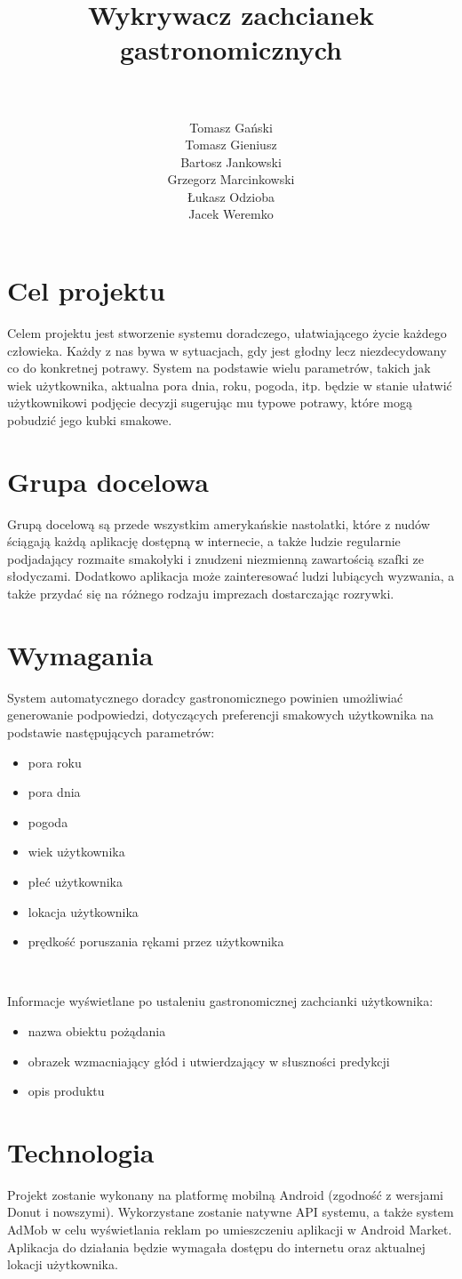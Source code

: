\documentclass[a4paper,twoside,11pt]{article}
\author{\\ ~ \\ Tomasz Gański \\
Tomasz Gieniusz \\
Bartosz Jankowski\\
Grzegorz Marcinkowski\\
Łukasz Odzioba\\
Jacek Weremko}
\title{\LARGE Wykrywacz zachcianek gastronomicznych}
\begin{document}


\tableofcontents

\newpage

\section{Cel projektu}
Celem projektu jest stworzenie systemu doradczego, ułatwiającego życie każdego człowieka. Każdy z nas bywa w sytuacjach, gdy jest głodny lecz niezdecydowany co do konkretnej potrawy. 
System na podstawie wielu parametrów, takich jak wiek użytkownika, aktualna pora dnia, roku, pogoda, itp. będzie w stanie ułatwić użytkownikowi podjęcie decyzji sugerując mu typowe potrawy, które mogą pobudzić jego kubki smakowe.

\section{Grupa docelowa}
Grupą docelową są przede wszystkim amerykańskie nastolatki, które z nudów ściągają każdą aplikację dostępną w internecie, a także ludzie regularnie podjadający rozmaite smakołyki i znudzeni niezmienną zawartością szafki ze słodyczami. Dodatkowo aplikacja może zainteresować ludzi lubiących wyzwania, a także przydać się na różnego rodzaju imprezach dostarczając rozrywki.

\section{Wymagania}
System automatycznego doradcy gastronomicznego powinien umożliwiać generowanie podpowiedzi, dotyczących preferencji smakowych użytkownika na podstawie następujących parametrów:
\begin{itemize}
\item pora roku
\item pora dnia
\item pogoda
\item wiek użytkownika
\item płeć użytkownika
\item lokacja użytkownika
\item prędkość poruszania rękami przez użytkownika
\end{itemize}
~ 

Informacje wyświetlane po ustaleniu gastronomicznej zachcianki użytkownika:
\begin{itemize}
\item nazwa obiektu pożądania
\item obrazek wzmacniający głód i utwierdzający w słuszności predykcji
\item opis produktu
\end{itemize}


\section{Technologia}
Projekt zostanie wykonany na platformę mobilną Android (zgodność z wersjami Donut i nowszymi). Wykorzystane zostanie natywne API systemu, a także system AdMob w celu wyświetlania reklam po umieszczeniu aplikacji w Android Market. Aplikacja do działania będzie wymagała dostępu do internetu oraz aktualnej lokacji użytkownika.
\end{document}
